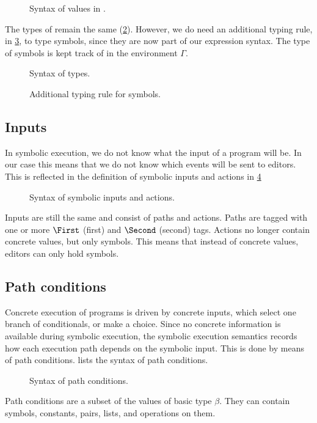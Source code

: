 \begin{figure}[ht]
  \small
  \caption{Syntax of values in \TOPHAT.}
  \label{fig:syntaxvalues}
\end{figure}

The types of \TOPHAT remain the same (\cref{fig:syntaxtypes}).
However, we do need an additional typing rule,  in \cref{fig:typingsymbol}, to type symbols,
since they are now part of our expression syntax.
The type of symbols is kept track of in the environment $\Gamma$.

\begin{figure}[b]
  \small
  \caption{Syntax of \TOPHAT types.}
  \label{fig:syntaxtypes}
\end{figure}

\begin{figure}[b]
  \small
  \caption{Additional typing rule for symbols.}
  \label{fig:typingsymbol}
\end{figure}



\subsection{Inputs}

In symbolic execution, we do not know what the input of a program will be.
In our case this means that we do not know which events will be sent to editors.
This is reflected in the definition of symbolic inputs and actions in \cref{fig:syntaxinputs}

\begin{figure}[ht]
  \small
  \caption{Syntax of symbolic inputs and actions.}
  \label{fig:syntaxinputs}
\end{figure}

Inputs are still the same and consist of paths and actions.
Paths are tagged with one or more $\First$ (first) and $\Second$ (second) tags.
Actions no longer contain concrete values, but only symbols.
This means that instead of concrete values, editors can only hold symbols.



\subsection{Path conditions}

Concrete execution of \TOPHAT programs is driven by concrete inputs, which select one branch of conditionals, or make a choice.
Since no concrete information is available during symbolic execution, the symbolic execution semantics records how each execution path depends on the symbolic input.
This is done by means of path conditions.
 lists the syntax of path conditions.

\begin{figure}[ht]
  \small
  \caption{Syntax of path conditions.}
  \label{fig:syntaxpredicates}
\end{figure}

Path conditions are a subset of the values of basic type $\beta$.
They can contain symbols, constants, pairs, lists, and operations on them.
